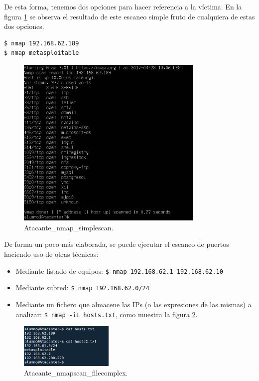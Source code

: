 \documentclass[a4,12pt,onecolum]{article}
\begin{document}
De esta forma, tenemos dos opciones para hacer referencia a la víctima. En la figura \ref{fig:nmap2} se observa el resultado de este escaneo simple fruto de cualquiera de estas dos opciones.

\begin{verbatim}
$ nmap 192.168.62.189
$ nmap metasploitable
\end{verbatim}

\begin{figure}[htbp]
\centering
\includegraphics[width=0.8\textwidth]{./images/Atacante_nmap_simplescan.png}
\caption{Atacante\_nmap\_simplescan.}
\label{fig:nmap2}
\end{figure}

De forma un poco más elaborada, se puede ejecutar el escaneo de puertos haciendo uso de otras técnicas:

\begin{itemize}
  \item Mediante listado de equipos: \texttt{\$ nmap 192.168.62.1 192.168.62.10}
  \item Mediante subred: \texttt{\$ nmap 192.168.62.0/24}
  \item Mediante un fichero que almacene las IPs (o las expresiones de las mismas) a analizar: \texttt{\$ nmap -iL hosts.txt}, como muestra la figura \ref{fig:nmap3}.
\end{itemize}

\begin{figure}[htbp]
\centering
\includegraphics[width=0.4\textwidth]{./images/Atacante_nmapscan_filecomplex.png}
\caption{Atacante\_nmapscan\_filecomplex.}
\label{fig:nmap3}
\end{figure}
\end{document}
